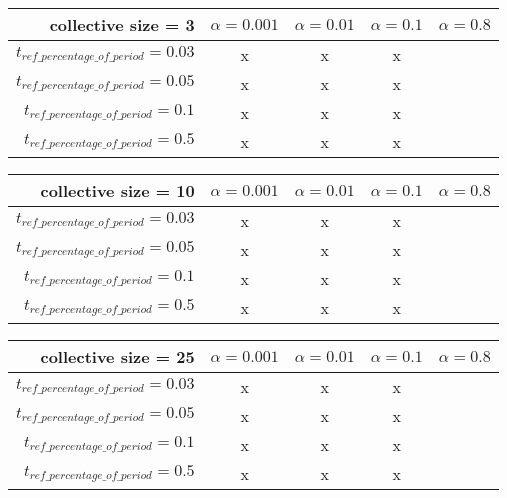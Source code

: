 \begin{table}[t]
	\begin{minipage}{\textwidth}
		\centering
		\begin{tabular}{r | c c c c} \toprule
			collective size = 3
			  & {$\alpha = 0.001$} & {$\alpha = 0.01$} & {$\alpha = 0.1$} & {$\alpha = 0.8$} \\\hline
			{$t_{ref\_percentage\_of\_period} = 0.03$} & x & x & x \\
			{$t_{ref\_percentage\_of\_period} = 0.05$} & x & x & x \\
			{$t_{ref\_percentage\_of\_period} = 0.1$} & x & x & x \\
			{$t_{ref\_percentage\_of\_period} = 0.5$} & x & x & x
		\end{tabular}
	\end{minipage}
	\nl
	
	\begin{minipage}{\textwidth}
		\centering
		\begin{tabular}{r | c c c c} \toprule
			collective size = 10
			  & {$\alpha = 0.001$} & {$\alpha = 0.01$} & {$\alpha = 0.1$} & {$\alpha = 0.8$} \\\hline
			{$t_{ref\_percentage\_of\_period} = 0.03$} & x & x & x \\
			{$t_{ref\_percentage\_of\_period} = 0.05$} & x & x & x \\
			{$t_{ref\_percentage\_of\_period} = 0.1$} & x & x & x \\
			{$t_{ref\_percentage\_of\_period} = 0.5$} & x & x & x
		\end{tabular}
	\end{minipage}
	
	\begin{minipage}{\textwidth}
		\centering
		\begin{tabular}{r | c c c c} \toprule
			collective size = 25
			  & {$\alpha = 0.001$} & {$\alpha = 0.01$} & {$\alpha = 0.1$} & {$\alpha = 0.8$} \\\hline
			{$t_{ref\_percentage\_of\_period} = 0.03$} & x & x & x \\
			{$t_{ref\_percentage\_of\_period} = 0.05$} & x & x & x \\
			{$t_{ref\_percentage\_of\_period} = 0.1$} & x & x & x \\
			{$t_{ref\_percentage\_of\_period} = 0.5$} & x & x & x
		\end{tabular}
	\end{minipage}
	

\end{table}

